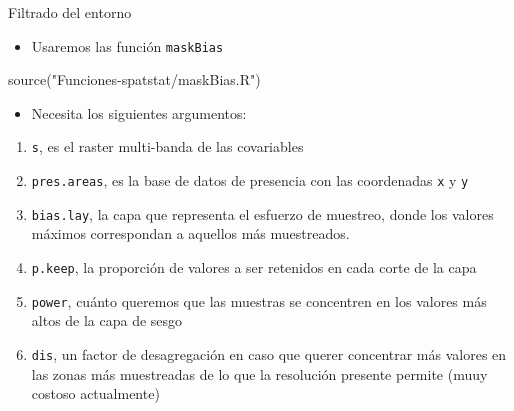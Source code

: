 \documentclass[
  11pt,
  ignorenonframetext,
]{beamer}
\newenvironment{Shaded}{}{}
\newcommand{\FunctionTok}[1]{\textcolor[rgb]{0.02,0.16,0.49}{#1}}
\newcommand{\NormalTok}[1]{#1}
\newcommand{\StringTok}[1]{\textcolor[rgb]{0.25,0.44,0.63}{#1}}
\providecommand{\tightlist}{%
  \setlength{\itemsep}{0pt}\setlength{\parskip}{0pt}}
\begin{document}
\begin{frame}[fragile]{Filtrado del entorno}
\protect\hypertarget{filtrado-del-entorno}{}
\begin{itemize}
\tightlist
\item
  Usaremos las función \texttt{maskBias}
\end{itemize}

\begin{Shaded}
\begin{Highlighting}[]
\FunctionTok{source}\NormalTok{(}\StringTok{"Funciones{-}spatstat/maskBias.R"}\NormalTok{)}
\end{Highlighting}
\end{Shaded}

\begin{itemize}
\tightlist
\item
  Necesita los siguientes argumentos:
\end{itemize}

\begin{enumerate}
\tightlist
\item
  \texttt{s}, es el raster multi-banda de las covariables
\item
  \texttt{pres.areas}, es la base de datos de presencia con las
  coordenadas \texttt{x} y \texttt{y}
\item
  \texttt{bias.lay}, la capa que representa el esfuerzo de muestreo,
  donde los valores máximos correspondan a aquellos más muestreados.
\item
  \texttt{p.keep}, la proporción de valores a ser retenidos en cada
  corte de la capa
\item
  \texttt{power}, cuánto queremos que las muestras se concentren en los
  valores más altos de la capa de sesgo
\item
  \texttt{dis}, un factor de desagregación en caso que querer concentrar
  más valores en las zonas más muestreadas de lo que la resolución
  presente permite (muuy costoso actualmente)
\end{enumerate}
\end{frame}
\end{document}

